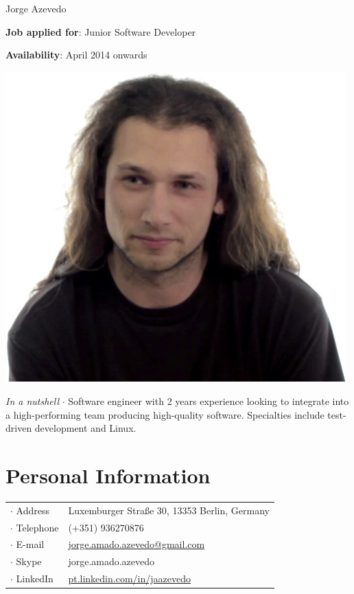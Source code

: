 



\topSection
{
	{\Huge Jorge Azevedo}

	\vspace{1.5mm}
	\vspace*{10mm}

	\textbf{Job applied for}: Junior Software Developer

	\textbf{Availability}: April 2014 onwards
} {
	\includegraphics[width=0.985\textwidth]{img/photo}
}

\emph{In a nutshell} $\cdot$ Software engineer with 2 years experience looking
to integrate into a high-performing team producing high-quality software.
Specialties include test-driven development and Linux.

\section*{Personal Information}

{
\begin{tabular}[t]{@{}l l}
	$\cdot$  Address & Luxemburger Straße 30, 13353 Berlin, Germany \\
	$\cdot$  Telephone & (+351) 936270876 \\
	$\cdot$  E-mail & \href{mailto:jorge.amado.azevedo@gmail.com}{jorge.amado.azevedo@gmail.com} \\
	$\cdot$  Skype & jorge.amado.azevedo\\
	$\cdot$  LinkedIn & \href{http://pt.linkedin.com/in/jaazevedo}{pt.linkedin.com/in/jaazevedo}\\
\end{tabular}
}

